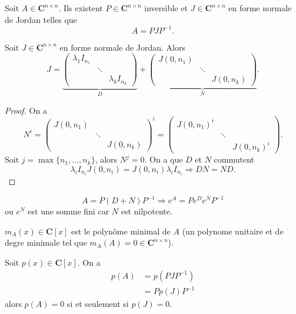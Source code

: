 \begin{theorem}
Soit $A\in \mathbf{C}^{n\times n}$. Ils existent $P\in \mathbf{C}^{n\times n}$ inversible et $J\in \mathbf{C}^{n\times n}$ en forme normale de Jordan telles que 
$$
A=PJP^{-1}.
$$
\end{theorem}
\begin{lemma}
Soit $J\in \mathbf{C}^{n\times n}$ en forme normale de Jordan. Alors 
$$
J=\underbrace{ \begin{pmatrix}
\lambda_{1}I_{n_{1}} &  &  \\
 & \ddots &  \\
 &  & \lambda _{k}I_{n_{k}}
\end{pmatrix} }_{ D }+\underbrace{ \begin{pmatrix}
J(0,n_{1}) &  &  \\
 & \ddots &  \\
 &  & J(0,n_{k})
\end{pmatrix} }_{ N }.
$$
\end{lemma}
\begin{proof}
On a
$$
N^{i}=\begin{pmatrix}
J(0,n_{1}) &  &  \\
 & \ddots &  \\
 &  & J(0,n_{k})
\end{pmatrix}^{i}=\begin{pmatrix}
J(0,n_{1})^{i} &   &  \\
 & \ddots &  \\
 &  & J(0,n_{k})^{i}
\end{pmatrix}.
$$
Soit $j=\max\{n_{1},\dots,n_{k}\}$, alors $N^{j}=0$. On a que $D$ et $N$ commutent 
$$
\lambda _{i}I_{n_{i}}J(0,n_{i})=J(0,n_{i})\lambda _{i}I_{n_{i}} \Rightarrow DN=ND.
$$
\end{proof}
\begin{reminder}
$$
A=P(D+N)P^{-1}\Rightarrow e^{A}=Pe^{ D }e^{ N }P^{-1}
$$
ou $e^{ N }$ est une somme fini car $N$ est nilpotente.
\end{reminder}


\begin{reminder}
$m_{A}(x)\in \mathbf{C}[x]$ est le polynôme minimal de $A$ (un polynome unitaire et de degre minimale tel que $m_{A}(A)=0\in \mathbf{C}^{n\times n}$).
\end{reminder}

Soit $p(x)\in \mathbf{C}[x]$. On a 
\begin{align*}
p(A) & =p(PJP^{-1}) \\
 & =Pp(J)P^{-1}
\end{align*}
alors $p(A)=0$ si et seulement si $p(J)=0$. 

